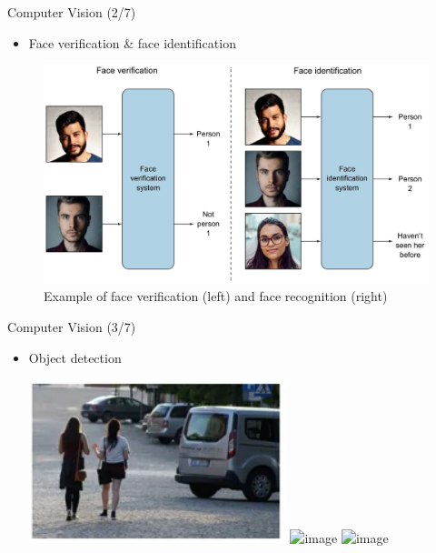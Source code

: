 \documentclass[pdf]{beamer}
\theoremstyle{mystyle}
\begin{document}
\begin{frame}{Computer Vision (2/7)}
	\begin{itemize}
		\item Face verification \& face identification
	\end{itemize}	
	\begin{figure}[!ht]
	\centering
	\includegraphics[scale=.232]{images/face-identification-recognition.jpg}
	\caption{Example of face verification (left) and face recognition (right) \citep{elgendy2020deeplearning4vision}}
\end{figure}
\end{frame}

\begin{frame}{Computer Vision (3/7)}
	\begin{itemize}
		\item Object detection
		\begin{center}
			\includegraphics[scale=.4]{object-detection-1} \qquad \includegraphics<2->[scale=.4]{object-detection-2}
			\bigskip			
			\includegraphics<3->[scale=.4]{object-detection-3}	
		\end{center}
	\end{itemize}
\end{frame}
\end{document}
